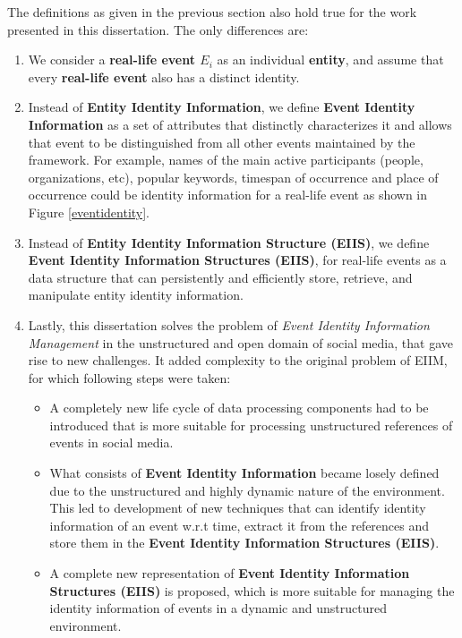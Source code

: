 The definitions as given in the previous section also hold true for the work presented in this dissertation. The only differences are:
\begin{enumerate}
\item We consider a \textbf{real-life event $E_{i}$} as an individual \textbf{entity}, and assume that every \textbf{real-life event} also has a distinct identity.

\item Instead of \textbf{Entity Identity Information}, we define \textbf{Event Identity Information} as a set of attributes that distinctly characterizes it and allows that event to be distinguished from all other events maintained by the framework. For example, names of the main active participants (people, organizations, etc), popular keywords, timespan of occurrence and place of occurrence could be identity information for a real-life event as shown in Figure \ref{eventidentity}.

\item Instead of \textbf{Entity Identity Information Structure (EIIS)}, we define \textbf{Event Identity Information Structures (EIIS)}, for real-life events as a data structure that can persistently and efficiently store, retrieve, and manipulate entity identity information.

\item Lastly, this dissertation solves the problem of \textit{Event Identity Information Management} in the unstructured and open domain of social media, that gave rise to new challenges. It added complexity to the original problem of EIIM, for which following steps were taken:

\begin{itemize}
\item A completely new life cycle of data processing components had to be introduced that is more suitable for processing unstructured references of events in social media.
\item What consists of \textbf{Event Identity Information} became losely defined due to the unstructured and highly dynamic nature of the environment. This led to development of new techniques that can identify identity information of an event w.r.t time, extract it from the references and store them in the \textbf{Event Identity Information Structures (EIIS)}.
\item A complete new representation of \textbf{Event Identity Information Structures (EIIS)} is proposed, which is more suitable for managing the identity information of events in a dynamic and unstructured environment.
\end{itemize}
\end{enumerate}


